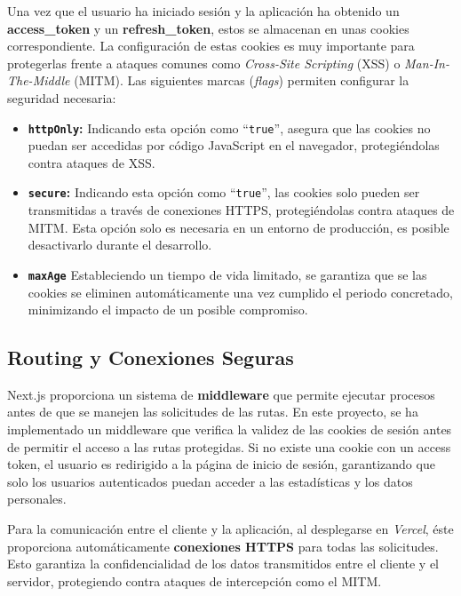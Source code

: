 Una vez que el usuario ha iniciado sesión y la aplicación ha obtenido un \textbf{access\_token} y un \textbf{refresh\_token}, estos se almacenan en unas cookies correspondiente. La configuración de estas cookies es muy importante para protegerlas frente a ataques comunes como \textit{Cross-Site Scripting} (XSS) o \textit{Man-In-The-Middle} (MITM). Las siguientes marcas (\textit{flags}) permiten configurar la seguridad necesaria:

\begin{itemize}
    \item \textbf{\texttt{httpOnly}:} Indicando esta opción como ``\texttt{true}'', asegura que las cookies no puedan ser accedidas por código JavaScript en el navegador, protegiéndolas contra ataques de XSS.
    \item \textbf{\texttt{secure}:} Indicando esta opción como ``\texttt{true}'', las cookies solo pueden ser transmitidas a través de conexiones HTTPS, protegiéndolas contra ataques de MITM. Esta opción solo es necesaria en un entorno de producción, es posible desactivarlo durante el desarrollo.
    \item \textbf{\texttt{maxAge}} Estableciendo un tiempo de vida limitado, se garantiza que se las cookies se eliminen automáticamente una vez cumplido el periodo concretado, minimizando el impacto de un posible compromiso.
\end{itemize}

\subsection{Routing y Conexiones Seguras}

Next.js proporciona un sistema de \textbf{middleware} que permite ejecutar procesos antes de que se manejen las solicitudes de las rutas. En este proyecto, se ha implementado un middleware que verifica la validez de las cookies de sesión antes de permitir el acceso a las rutas protegidas. Si no existe una cookie con un access token, el usuario es redirigido a la página de inicio de sesión, garantizando que solo los usuarios autenticados puedan acceder a las estadísticas y los datos personales.

Para la comunicación entre el cliente y la aplicación, al desplegarse en \textit{Vercel}, éste proporciona automáticamente \textbf{conexiones HTTPS} para todas las solicitudes. Esto garantiza la confidencialidad de los datos transmitidos entre el cliente y el servidor, protegiendo contra ataques de intercepción como el MITM.

